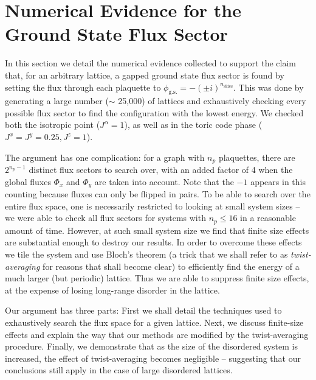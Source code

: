 \hypertarget{apx:ground_state}{%
\section{Numerical Evidence for the Ground State Flux
Sector}\label{apx:ground_state}}

In this section we detail the numerical evidence collected to support
the claim that, for an arbitrary lattice, a gapped ground state flux
sector is found by setting the flux through each plaquette to
\(\phi_{\mathrm{g.s.}} = -(\pm i)^{n_{\mathrm{sides}}}\). This was done
by generating a large number (\(\sim\) 25,000) of lattices and
exhaustively checking every possible flux sector to find the
configuration with the lowest energy. We checked both the isotropic
point (\(J^\alpha = 1\)), as well as in the toric code phase
(\(J^x = J^y = 0.25, J^z = 1\)).

The argument has one complication: for a graph with \(n_p\) plaquettes,
there are \(2^{n_p - 1}\) distinct flux sectors to search over, with an
added factor of 4 when the global fluxes \(\Phi_x\) and \(\Phi_y\) are
taken into account. Note that the \(-1\) appears in this counting
because fluxes can only be flipped in pairs. To be able to search over
the entire flux space, one is necessarily restricted to looking at small
system sizes -- we were able to check all flux sectors for systems with
\(n_p \leq 16\) in a reasonable amount of time. However, at such small
system size we find that finite size effects are substantial enough to
destroy our results. In order to overcome these effects we tile the
system and use Bloch's theorem (a trick that we shall refer to as
\emph{twist-averaging} for reasons that shall become clear) to
efficiently find the energy of a much larger (but periodic) lattice.
Thus we are able to suppress finite size effects, at the expense of
losing long-range disorder in the lattice.

Our argument has three parts: First we shall detail the techniques used
to exhaustively search the flux space for a given lattice. Next, we
discuss finite-size effects and explain the way that our methods are
modified by the twist-averaging procedure. Finally, we demonstrate that
as the size of the disordered system is increased, the effect of
twist-averaging becomes negligible -- suggesting that our conclusions
still apply in the case of large disordered lattices.

